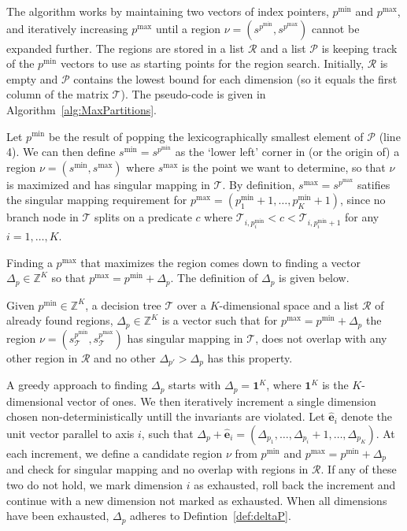The algorithm works by maintaining two vectors of index pointers, $p^{\min}$ and
$p^{\max}$, and iteratively increasing $p^{\max}$ until a region $\nu =
(s^{p^{\min}}, s^{p^{\max}})$ cannot be expanded further. The regions are stored
in a list $\mathcal{R}$ and a list $\mathcal{P}$ is keeping track of the
$p^{\min}$ vectors to use as starting points for the region search. Initially,
$\mathcal{R}$ is empty and $\mathcal{P}$ contains the lowest bound for each
dimension (so it equals the first column of the matrix $\mathcal{T}$). The
pseudo-code is given in Algorithm~\ref{alg:MaxPartitions}.

Let $p^{\min}$ be the result of popping the lexicographically smallest element
of $\mathcal{P}$ (line 4). We can then define $s^{\min} = s^{p^{\min}}$ as the
`lower left' corner in (or the origin of) a region $\nu = (s^{\min}, s^{\max})$
where $s^{\max}$ is the point we want to determine, so that $\nu$ is maximized
and has singular mapping in $\mathcal{T}$. By definition, $s^{\max} =
s^{p^{\max}}$ satifies the singular mapping requirement for $p^{\max} =
(p^{\min}_{1} + 1, \ldots, p^{\min}_{K} + 1)$, since no branch node in
$\mathcal{T}$ splits on a predicate $c$ where $\mathcal{T}_{i,p^{\min}_{i}} < c
< \mathcal{T}_{i,p^{\min}_{i} + 1}$ for any $i = 1, \ldots, K$. 

Finding a $p^{\max}$ that maximizes the region comes down to finding a vector
$\Delta_{p} \in \mathbb{Z}^{K}$ so that $p^{\max} = p^{\min} + \Delta_{p}$. The
definition of $\Delta_{p}$ is given below.

\begin{definition}
    Given $p^{\min} \in \mathbb{Z}^{K}$, a decision tree $\mathcal{T}$ over a
    $K$-dimensional space and a list $\mathcal{R}$ of already found regions,
    $\Delta_{p} \in \mathbb{Z}^{K}$ is a vector such that for $p^{\max} =
    p^{\min} + \Delta_{p}$ the region $\nu = (s^{p^{\min}}_{\mathcal{T}},
    s^{p^{\max}}_{\mathcal{T}})$ has singular mapping in $\mathcal{T}$, does not
    overlap with any other region in $\mathcal{R}$ and no other $\Delta_{p'} >
    \Delta_{p}$ has this property.
\end{definition}\label{def:deltaP}

A greedy approach to finding $\Delta_{p}$ starts with $\Delta_{p} =
\mathbf{1}^{K}$, where $\mathbf{1}^{K}$ is the $K$-dimensional vector of ones.
We then iteratively increment a single dimension chosen non-deterministically
untill the invariants are violated.  Let $\mathbf{\hat{e}}_i$ denote the unit
vector parallel to axis $i$, such that $\Delta_{p} + \mathbf{\hat{e}}_i =
(\Delta_{p_1},\ldots,\Delta_{p_i} + 1,\ldots,\Delta_{p_K})$. At each increment,
we define a candidate region $\nu$ from $p^{\min}$ and $p^{\max} = p^{\min} +
\Delta_{p}$ and check for singular mapping and no overlap with regions in
$\mathcal{R}$. If any of these two do not hold, we mark dimension $i$ as
exhausted, roll back the increment and continue with a new dimension not marked
as exhausted. When all dimensions have been exhausted, $\Delta_{p}$ adheres to
Defintion~\ref{def:deltaP}.

